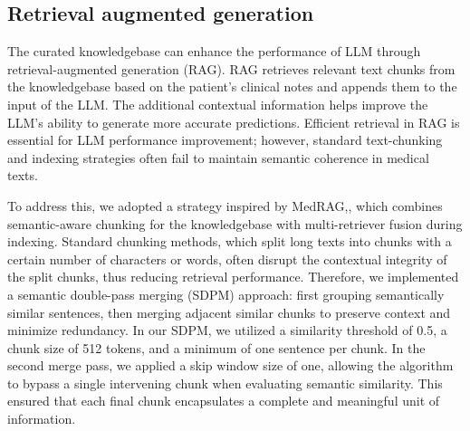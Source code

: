 \documentclass[fleqn,10pt]{wlscirep}
\begin{document}
\subsection*{Retrieval augmented generation}

The curated knowledgebase can enhance the performance of LLM through retrieval-augmented generation (RAG). RAG retrieves relevant text chunks from the knowledgebase based on the patient’s clinical notes and appends them to the input of the LLM. The additional contextual information helps improve the LLM’s ability to generate more accurate predictions. Efficient retrieval in RAG is essential for LLM performance improvement; however, standard text-chunking and indexing strategies often fail to maintain semantic coherence in medical texts. 

To address this, we adopted a strategy inspired by MedRAG,\cite{xiong2024benchmarking}, which combines semantic-aware chunking for the knowledgebase with multi-retriever fusion during indexing. Standard chunking methods, which split long texts into chunks with a certain number of characters or words, often disrupt the contextual integrity of the split chunks, thus reducing retrieval performance. Therefore, we implemented a semantic double-pass merging (SDPM) approach: first grouping semantically similar sentences, then merging adjacent similar chunks to preserve context and minimize redundancy. In our SDPM, we utilized a similarity threshold of 0.5, a chunk size of 512 tokens, and a minimum of one sentence per chunk. In the second merge pass, we applied a skip window size of one, allowing the algorithm to bypass a single intervening chunk when evaluating semantic similarity. This ensured that each final chunk encapsulates a complete and meaningful unit of information. 
\end{document}
